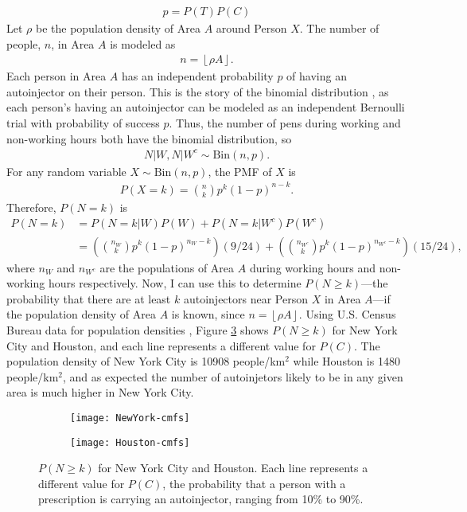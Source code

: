 \begin{align*}
    p = P(T)P(C)
\end{align*}
Let $\rho$ be the population density of Area $A$ around Person $X$. The number of people, $n$, in Area $A$ is modeled as
\begin{align*}
    n = \left\lfloor\rho A \right\rfloor.
\end{align*}
Each person in Area $A$ has an independent probability $p$ of having an autoinjector on their person. This is the story of the binomial distribution \cite{blitz}, as each person's having an autoinjector can be modeled as an independent Bernoulli trial with probability of success $p$. Thus, the number of pens during working and non-working hours both have the binomial distribution, so
\begin{align*}
    N|W,N|W^c \sim \text{Bin}(n,p).
\end{align*}
For any random variable $X \sim \text{Bin}(n,p)$, the PMF of $X$ is
\begin{align*}
    P(X=k) = \binom{n}{k}p^k(1-p)^{n-k}.
\end{align*}
Therefore, $P(N=k)$ is
\begin{align*}
    P(N=k) &= P(N=k|W)P(W) + P(N=k|W^c)P(W^c) \\
    &= \left(\binom{n_W}{k}p^k(1-p)^{n_W-k}\right)\left(9/24\right) + \left(\binom{n_{W^c}}{k}p^k(1-p)^{n_{W^c}-k}\right)\left(15/24\right),
\end{align*}
where $n_W$ and $n_{W^c}$ are the populations of Area $A$ during working hours and non-working hours respectively. Now, I can use this to determine $P(N\geq k)$---the probability that there are at least $k$ autoinjectors near Person $X$ in Area $A$---if the population density of Area $A$ is known, since $n=\left\lfloor \rho A \right\rfloor$. Using U.S. Census Bureau data for population densities \cite{acs}, Figure \ref{fig:nyandhouston} shows $P(N \geq k)$ for New York City and Houston, and each line represents a different value for $P(C)$. The population density of New York City is 10908 people/km$^2$ while Houston is 1480 people/km$^2$, and as expected the number of autoinjetors likely to be in any given area is much higher in New York City.

\begin{figure}[h]
\centering
\begin{subfigure}{.5\textwidth}
  \centering
  \texttt{[image: NewYork-cmfs]}
  \label{fig:newyorkcmf}
\end{subfigure}%
\begin{subfigure}{.5\textwidth}
  \centering
  \texttt{[image: Houston-cmfs]}
  \label{fig:houstoncmf}
\end{subfigure}
\caption{$P(N\geq k)$ for New York City and Houston. Each line represents a different value for $P(C)$, the probability that a person with a prescription is carrying an autoinjector, ranging from 10\% to 90\%.}
\label{fig:nyandhouston}
\end{figure}

